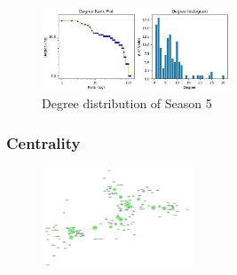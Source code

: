 \documentclass[10pt,twocolumn,letterpaper]{article}
\begin{document}
\begin{figure}[!h]
    \centering
    \includegraphics[width=0.5\textwidth]{img/s5/degree_plot.jpg}
    \caption{\small{Degree distribution of Season 5}}
\end{figure}


\subsubsection{Centrality}


\begin{figure}[!h]
    \centering
    \includegraphics[width=0.4\textwidth]{img/s5/pagerank_graph.jpg}
\end{figure}
\end{document}
